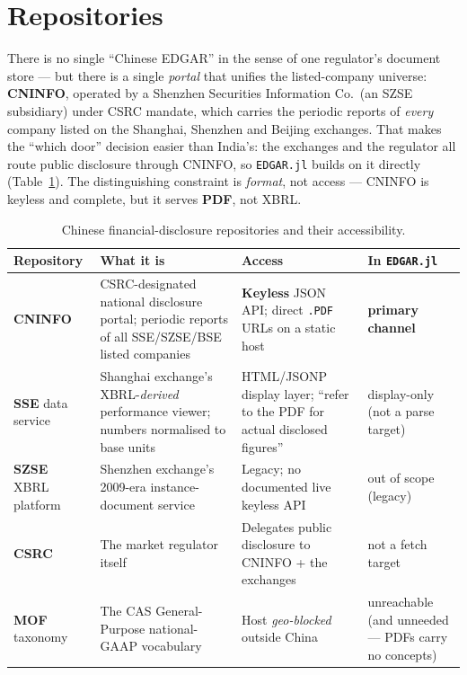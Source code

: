 \documentclass[11pt,a4paper]{report}
\begin{document}
\section{Repositories}\label{sec:china-repos}

There is no single ``Chinese EDGAR'' in the sense of one regulator's document store --- but there is a
single \emph{portal} that unifies the listed-company universe: \textbf{CNINFO}, operated by a Shenzhen
Securities Information Co.\ (an SZSE
subsidiary) under CSRC mandate, which carries the periodic reports of \emph{every} company listed on the
Shanghai, Shenzhen and Beijing exchanges. That makes the ``which door'' decision easier than India's: the
exchanges and the regulator all route public disclosure through CNINFO, so \texttt{EDGAR.jl} builds on it
directly (Table~\ref{tab:china-repos}). The distinguishing constraint is \emph{format}, not access ---
CNINFO is keyless and complete, but it serves \textbf{PDF}, not XBRL.

\begin{table}[h]
\centering
\small
\caption{Chinese financial-disclosure repositories and their accessibility.}
\label{tab:china-repos}
\begin{tabular}{@{}p{}p{}p{}p{}@{}}
\toprule
\textbf{Repository} & \textbf{What it is} & \textbf{Access} & \textbf{In \texttt{EDGAR.jl}} \\
\midrule
\textbf{CNINFO} & CSRC-designated national disclosure portal; periodic reports of all SSE/SZSE/BSE listed companies & \textbf{Keyless} JSON API; direct \texttt{.PDF} URLs on a static host & \textbf{primary channel} \\
\textbf{SSE} data service & Shanghai exchange's XBRL-\emph{derived} performance viewer; numbers normalised to base units & HTML/JSONP display layer; ``refer to the PDF for actual disclosed figures'' & display-only (not a parse target) \\
\textbf{SZSE} XBRL platform & Shenzhen exchange's 2009-era instance-document service & Legacy; no documented live keyless API & out of scope (legacy) \\
\textbf{CSRC} & The market regulator itself & Delegates public disclosure to CNINFO + the exchanges & not a fetch target \\
\textbf{MOF} taxonomy & The CAS General-Purpose national-GAAP vocabulary & Host \emph{geo-blocked} outside China & unreachable (and unneeded --- PDFs carry no concepts) \\
\bottomrule
\end{tabular}
\end{table}
\end{document}
